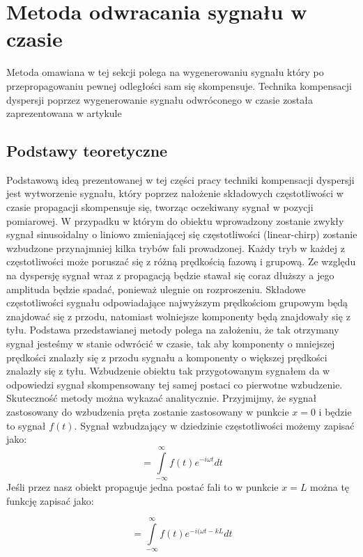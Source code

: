 \section{Metoda odwracania sygnału w czasie}
\label{sec:metoda_tr}

Metoda omawiana w tej sekcji polega na wygenerowaniu sygnału który po przepropagowaniu pewnej odległości sam się skompensuje. Technika kompensacji dyspersji poprzez wygenerowanie sygnału odwróconego w czasie została zaprezentowana w artykule \cite{kasia4}

\subsection{Podstawy teoretyczne}
Podstawową ideą prezentowanej w tej części pracy techniki kompensacji dyspersji jest wytworzenie sygnału, który poprzez nałożenie składowych częstotliwości w czasie propagacji skompensuje się, tworząc oczekiwany sygnał w pozycji pomiarowej. W przypadku w którym do obiektu wprowadzony zostanie zwykły sygnał sinusoidalny o liniowo zmieniającej się częstotliwości (linear-chirp) zostanie wzbudzone przynajmniej kilka trybów fali prowadzonej. Każdy tryb w każdej z częstotliwości może poruszać się z różną prędkością fazową i grupową. Ze względu na dyspersję sygnał wraz z propagacją będzie stawał się coraz dłuższy a jego amplituda będzie spadać, ponieważ ulegnie on rozproszeniu.  Składowe częstotliwości sygnału odpowiadające najwyższym prędkościom grupowym będą znajdować się z przodu, natomiast wolniejsze komponenty będą znajdowały się z tyłu. Podstawa przedstawianej metody polega na założeniu, że tak otrzymany sygnał jesteśmy w stanie odwrócić w czasie, tak aby komponenty o mniejszej prędkości znalazły się z przodu sygnału a komponenty o większej prędkości znalazły się z tyłu. Wzbudzenie obiektu tak przygotowanym sygnałem da w odpowiedzi sygnał skompensowany tej samej postaci co pierwotne wzbudzenie. Skuteczność metody można wykazać analitycznie. Przyjmijmy, że sygnał zastosowany do wzbudzenia pręta zostanie zastosowany w punkcie $x = 0$ i będzie to sygnał $f(t)$. Sygnał wzbudzający w dziedzinie częstotliwości możemy zapisać jako:
\begin{equation}
[F(\omega)_{x=0}]=\int\limits_{-\infty}^{\infty}f(t)e^{-i\omega t}dt \label{eq:F(omega)_x=0}
\end{equation}
Jeśli przez nasz obiekt propaguje jedna postać fali to w punkcie $x=L$ można tę funkcję zapisać jako:

\begin{equation}
[F(\omega)_{x=L}]=\int\limits_{-\infty}^{\infty}f(t)e^{-i(\omega t - kL}dt \label{eq:F(omega)_x=L}
\end{equation}

